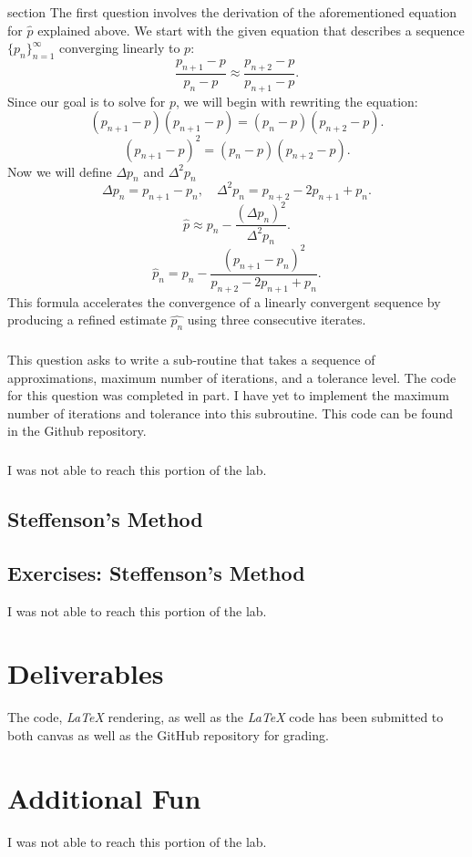 \documentclass{article}
\begin{document}
\subsubsection{}section{}
The first question involves the derivation of the aforementioned equation for \(\hat{p}\) explained above. We start with the given equation that describes a sequence \(\{p_n\}_{n=1}^{\infty}\) converging linearly to \( p \):
\[
\frac{p_{n+1} - p}{p_n - p} \approx \frac{p_{n+2} - p}{p_{n+1} - p}.
\]
Since our goal is to solve for \(p\), we will begin with rewriting the equation:
\[
(p_{n+1} - p)(p_{n+1} - p) = (p_n - p)(p_{n+2} - p).
\]
\[
(p_{n+1} - p)^2 = (p_n - p)(p_{n+2} - p).
\]
Now we will define \(\Delta p_n\) and \(\Delta ^2p_n\)
\[
\Delta p_n = p_{n+1} - p_n, \quad \Delta^2 p_n = p_{n+2} - 2p_{n+1} + p_n.
\]
\[
\hat{p} \approx p_n - \frac{(\Delta p_n)^2}{\Delta^2 p_n}.
\]
\[
\hat{p}_n = p_n - \frac{(p_{n+1} - p_n)^2}{p_{n+2} - 2p_{n+1} + p_n}.
\]
This formula accelerates the convergence of a linearly convergent sequence by producing a refined estimate \(\hat{p_n} \) using three consecutive iterates.

\subsubsection{}
This question asks to write a sub-routine that takes a sequence of approximations, maximum number of iterations, and a tolerance level. The code for this question was completed in part. I have yet to implement the maximum number of iterations and tolerance into this subroutine. This code can be found in the Github repository.

\subsubsection{}
I was not able to reach this portion of the lab.

\subsection{Steffenson's Method}

\subsection{Exercises: Steffenson's Method}
I was not able to reach this portion of the lab.

\section{Deliverables}
The code, \textit{LaTeX} rendering, as well as the \textit{LaTeX} code has been submitted to both canvas as well as the GitHub repository for grading.

\section{Additional Fun}
I was not able to reach this portion of the lab.
\end{document}
